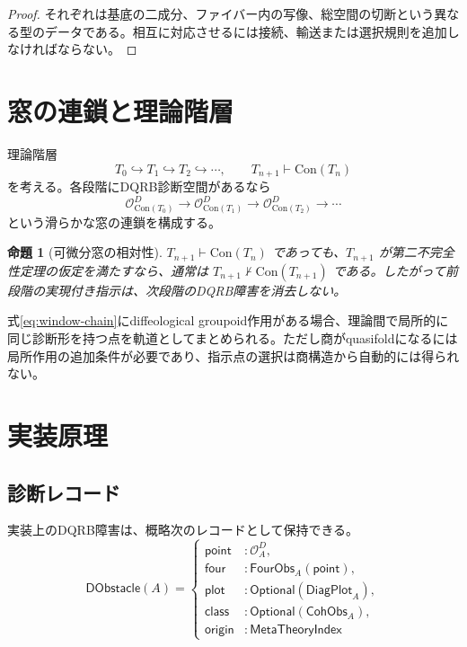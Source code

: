 \documentclass[a4paper,11pt]{ltjsarticle}
\theoremstyle{definition}
\theoremstyle{plain}
\newtheorem{proposition}[definition]{命題}
\newcommand{\Con}{\mathrm{Con}}
\begin{document}
\begin{proof}
それぞれは基底の二成分、ファイバー内の写像、総空間の切断という異なる型のデータである。相互に対応させるには接続、輸送または選択規則を追加しなければならない。
\end{proof}

\section{窓の連鎖と理論階層}

理論階層
\begin{equation}
 T_0\hookrightarrow T_1\hookrightarrow T_2
 \hookrightarrow\cdots,
 \qquad
 T_{n+1}\vdash\Con(T_n)
 \end{equation}
を考える。各段階にDQRB診断空間があるなら
\begin{equation}
 \mathcal O_{\Con(T_0)}^D
 \longrightarrow
 \mathcal O_{\Con(T_1)}^D
 \longrightarrow
 \mathcal O_{\Con(T_2)}^D
 \longrightarrow\cdots
 \label{eq:window-chain}
\end{equation}
という滑らかな窓の連鎖を構成する。

\begin{proposition}[可微分窓の相対性]
$T_{n+1}\vdash\Con(T_n)$ であっても、$T_{n+1}$ が第二不完全性定理の仮定を満たすなら、通常は $T_{n+1}\nvdash\Con(T_{n+1})$ である。したがって前段階の実現付き指示は、次段階のDQRB障害を消去しない。
\end{proposition}

式\eqref{eq:window-chain}にdiffeological groupoid作用がある場合、理論間で局所的に同じ診断形を持つ点を軌道としてまとめられる。ただし商がquasifoldになるには局所作用の追加条件が必要であり、指示点の選択は商構造から自動的には得られない。

\section{実装原理}

\subsection{診断レコード}

実装上のDQRB障害は、概略次のレコードとして保持できる。
\begin{equation}
 \mathsf{DObstacle}(A)=
 \left\{
 \begin{array}{ll}
 \mathsf{point} &: \mathcal O_A^D,\\
 \mathsf{four} &: \mathsf{FourObs}_A(\mathsf{point}),\\
 \mathsf{plot} &: \mathsf{Optional}(\mathsf{DiagPlot}_A),\\
 \mathsf{class} &: \mathsf{Optional}(\mathsf{CohObs}_A),\\
 \mathsf{origin} &: \mathsf{MetaTheoryIndex}
 \end{array}
 \right.
 \label{eq:implementation-record}
\end{equation}
\end{document}
